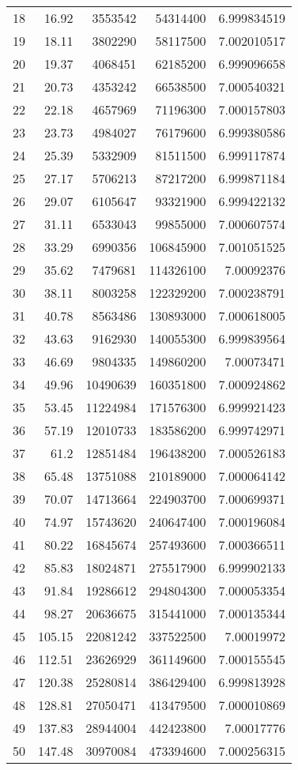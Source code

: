 \documentclass{article}      %
\begin{document}
\begin{appendix}
\begin{center}
\begin{tabular}{ |c|r|r|r|r| }
 18 & 16.92 & 3553542 & 54314400 & 6.999834519 \\
 19 & 18.11 & 3802290 & 58117500 & 7.002010517 \\
 20 & 19.37 & 4068451 & 62185200 & 6.999096658 \\
 21 & 20.73 & 4353242 & 66538500 & 7.000540321 \\
 22 & 22.18 & 4657969 & 71196300 & 7.000157803 \\
 23 & 23.73 & 4984027 & 76179600 & 6.999380586 \\
 24 & 25.39 & 5332909 & 81511500 & 6.999117874 \\
 25 & 27.17 & 5706213 & 87217200 & 6.999871184 \\
 26 & 29.07 & 6105647 & 93321900 & 6.999422132 \\
 27 & 31.11 & 6533043 & 99855000 & 7.000607574 \\
 28 & 33.29 & 6990356 & 106845900 & 7.001051525 \\
 29 & 35.62 & 7479681 & 114326100 & 7.00092376 \\
 30 & 38.11 & 8003258 & 122329200 & 7.000238791 \\
 31 & 40.78 & 8563486 & 130893000 & 7.000618005 \\
 32 & 43.63 & 9162930 & 140055300 & 6.999839564 \\
 33 & 46.69 & 9804335 & 149860200 & 7.00073471 \\
 34 & 49.96 & 10490639 & 160351800 & 7.000924862 \\
 35 & 53.45 & 11224984 & 171576300 & 6.999921423 \\
 36 & 57.19 & 12010733 & 183586200 & 6.999742971 \\
 37 & 61.2 & 12851484 & 196438200 & 7.000526183 \\
 38 & 65.48 & 13751088 & 210189000 & 7.000064142 \\
 39 & 70.07 & 14713664 & 224903700 & 7.000699371 \\
 40 & 74.97 & 15743620 & 240647400 & 7.000196084 \\
 41 & 80.22 & 16845674 & 257493600 & 7.000366511 \\
 42 & 85.83 & 18024871 & 275517900 & 6.999902133 \\
 43 & 91.84 & 19286612 & 294804300 & 7.000053354 \\
 44 & 98.27 & 20636675 & 315441000 & 7.000135344 \\
 45 & 105.15 & 22081242 & 337522500 & 7.00019972 \\
 46 & 112.51 & 23626929 & 361149600 & 7.000155545 \\
 47 & 120.38 & 25280814 & 386429400 & 6.999813928 \\
 48 & 128.81 & 27050471 & 413479500 & 7.000010869 \\
 49 & 137.83 & 28944004 & 442423800 & 7.00017776 \\
 50 & 147.48 & 30970084 & 473394600 & 7.000256315 \\
 \hline
\end{tabular}
\end{center}


\end{appendix}
\end{document}
